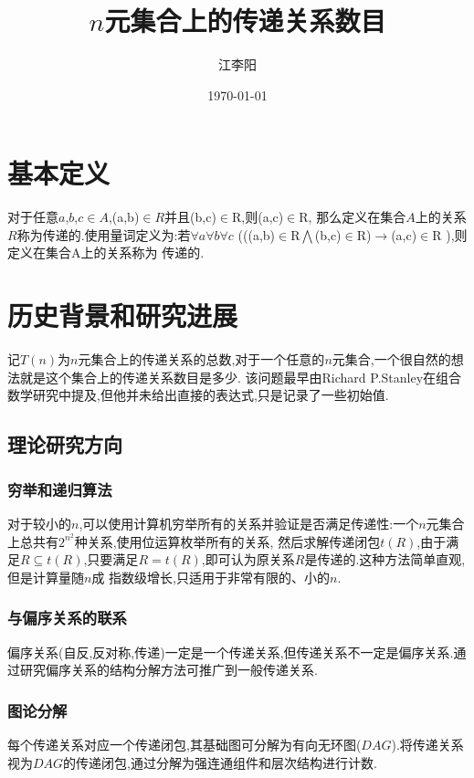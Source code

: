 \documentclass[12pt]{article}
\title{$n$元集合上的传递关系数目}
\author{江李阳}
\date{\today}
\theoremstyle{definition}
\begin{document}
\maketitle

\section{基本定义}
对于任意$a$,$b$,$c$$\in$$A$,(a,b)$\in$$R$并且(b,c)$\in$R,则(a,c)$\in$R,
那么定义在集合$A$上的关系$R$称为传递的.使用量词定义为:若$\forall a$$\forall b$$\forall c$ 
(((a,b)$\in$R$\bigwedge$(b,c)$\in$R)$\rightarrow $(a,c)$\in$R ),则定义在集合A上的关系称为
传递的.
\section{历史背景和研究进展}
记$T(n)$为$n$元集合上的传递关系的总数,对于一个任意的$n$元集合,一个很自然的想法就是这个集合上的传递关系数目是多少.
该问题最早由Richard P.Stanley在组合数学研究中提及,但他并未给出直接的表达式,只是记录了一些初始值.
\subsection{理论研究方向}
\subsubsection{穷举和递归算法}
对于较小的$n$,可以使用计算机穷举所有的关系并验证是否满足传递性:一个$n$元集合上总共有$2^{n^{2}}$种关系,使用位运算枚举所有的关系,
然后求解传递闭包$t(R)$,由于满足$R\subseteq t(R)$,只要满足$R=t(R)$,即可认为原关系$R$是传递的.这种方法简单直观,但是计算量随$n$成
指数级增长,只适用于非常有限的、小的$n$.
\subsubsection{与偏序关系的联系}
偏序关系(自反,反对称,传递)一定是一个传递关系,但传递关系不一定是偏序关系.通过研究偏序关系的结构分解方法可推广到一般传递关系.
\subsubsection{图论分解}
每个传递关系对应一个传递闭包,其基础图可分解为有向无环图($DAG$).将传递关系视为$DAG$的传递闭包,通过分解为强连通组件和层次结构进行计数.
\end{document}
